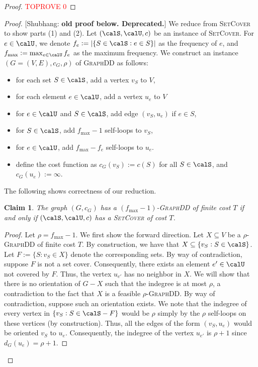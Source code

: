 \documentclass{article}
\newtheorem{claim}{Claim}[section]
\newcommand{\shubhang}[1]{{\color{blue}[{\tiny Shubhang: \bf #1}]\marginpar{\color{blue}*}}}
\newcommand{\densitydeletionset}{\textsc{GraphDD}\xspace}
\newcommand{\setcover}{\textsc{SetCover}\xspace}
\begin{document}
\thmDDSlognHard*
\begin{proof}\textcolor{red}{TOPROVE 0}\end{proof}


\iffalse
\begin{proof}\shubhang{old proof below. Deprecated.}
We reduce from \setcover to show parts (1) and (2). Let $(\calS, \calU, c)$ be an instance of \setcover. For $e \in \calU$, we denote $f_e := |\{S \in \calS : e \in S\}|$ as the frequency of $e$, and $f_{\max} := \max_{e\in \calU} f_e$ as the maximum frequency. We construct an instance $(G = (V, E), c_G, \rho)$ of \densitydeletionset as follows:
\begin{itemize}
    \item for each set $S \in \calS$, add a vertex $v_S$ to $V$,
    \item for each element $e \in \calU$, add a vertex $u_e$ to $V$
    \item for $e\in \calU$ and $S \in \calS$, add edge $(v_S, u_e)$ if $e \in S$,
    \item for $S \in \calS$, add $f_{\max} - 1$ self-loops to $v_S$,
    \item for $e \in \calU$, add $f_{\max} - f_e$ self-loops to $u_e$.
    \item define the cost function as $c_G(v_S) := c(S)$ for all $S \in \calS$, and $c_G(u_e) := \infty$.
\end{itemize}
The following shows correctness of our reduction.
\begin{claim}
    The graph $(G, c_G)$ has a $(f_{\max} - 1)$-\densitydeletionset of finite cost $T$ if and only if $(\calS, \calU, c)$ has a \setcover of cost $T$.
\end{claim}
\begin{proof}
    Let $\rho = f_{\max} - 1$.
    We first show the forward direction. Let $X \subseteq V$ be a $\rho$-\densitydeletionset of finite cost $T$. By construction, we have that $X \subseteq \{v_S : S \in \calS\}$. Let $F := \{S : v_S \in X\}$ denote the corresponding sets. By way of contradiction, suppose $F$ is not a set cover. Consequently, there exists an element $e' \in \calU$ not covered by $F$. Thus, the vertex $u_{e'}$ has no neighbor in $X$. We will show that there is no orientation of $G - X$ such that the indegree is at most $\rho$, a contradiction to the fact that $X$ is a feasible $\rho$-\densitydeletionset. By way of contradiction, suppose such an orientation exists. We note that the indegree of every vertex in $\{v_S : S \in \calS - F\}$ would be $\rho$ simply by the $\rho$ self-loops on these vertices (by construction). Thus, all the edges of the form $(v_S, u_e)$ would be oriented $v_S$ to $u_e$. Consequently, the indegree of the vertex $u_{e'}$ is $\rho+1$ since $d_G(u_e) = \rho+1$.


\end{proof}
\end{proof}
\end{document}
